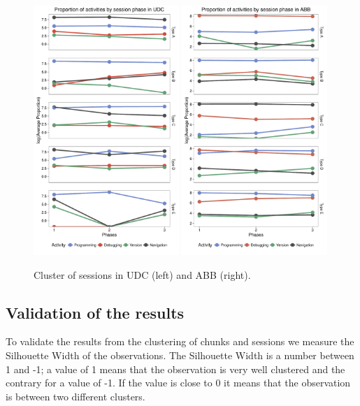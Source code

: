 \begin{figure}[!ht]

	\centering
	\includegraphics[width=0.49\textwidth]{Figures/UDC_phases_log}
	\includegraphics[width=0.49\textwidth]{Figures/ABB_phases_log}
		
	\caption{Cluster of sessions in UDC (left) and ABB (right).}
		\label{ABB_phases}
\end{figure}


\subsection{Validation of the results}
To validate the results from the clustering of chunks and sessions we measure the Silhouette Width of the observations. The Silhouette Width is a number between 1 and -1; a value of 1 means that the observation is very well clustered and the contrary for a value of -1. If the value is close to 0 it means that the observation is between two different clusters.

